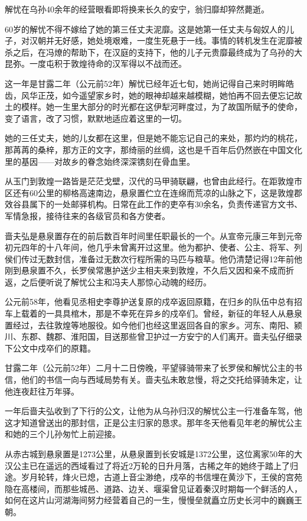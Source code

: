 解忧在乌孙40余年的经营眼看即将换来长久的安宁，翁归靡却猝然薨逝。

60岁的解忧不得不嫁给了她的第三任丈夫泥靡。这是她第一任丈夫与匈奴人的儿子，对汉朝并无好感，她处境艰难，一度生死悬于一线。事情的转机发生在泥靡被杀之后，在冯燎的帮助下，在汉庭的支持下，他的儿子元贵靡最终成为了乌孙的大昆弥。一度屯积于敦煌待命的汉军得以不战而还。

这一年是甘露二年（公元前52年）解忧已经年近七旬，她尚记得自己来时明眸皓齿，风华正茂，如今遥望家乡时，她的眼神却越来越模糊，她怕再不回去便忘记故土的模样。她一生里大部分的时光都在这伊犁河畔度过，为了故国所赋予的使命，变了语言，改了习惯，默默地适应着这里的一切。

她的三任丈夫，她的儿女都在这里，但是她不能忘记自己的来处，那灼灼的桃花，那苒苒的桑梓，那方正的文字，那绮丽的丝绸，这也是千百年后仍然嵌在中国文化里的基因——对故乡的眷念始终深深镌刻在骨血里。

从玉门到敦煌一路皆是茫茫戈壁，汉代的马甲骑联翩，也曾由此经行。在距敦煌市区还有60公里的柳格高速南边，悬泉置伫立在连绵而荒凉的山脉之下，这是敦煌郡效谷县属下的一处邮驿机构。日常在此工作的吏卒有30余名，负责传递官方文书、军情急报，接待往来的各级官员和各方使者。

啬夫弘是悬泉置存在的前后数百年时间里任职最长的一个。从宣帝元康三年到元帝初元四年的十八年间，他几乎未曾离开过这里。他为都护、使者、公主、将军、列侯们传过无数封信，准备过无数次行程所需的马匹与粮草。他仍清楚记得12年前他刚到悬泉置不久，长罗侯常惠护送少主相夫来到敦煌，不久后又因和亲不成而折返，之后便听说了解忧公主和冯夫人那惊心动魄的经历。

公元前58年，他看见丞相史李尊护送复原的戍卒返回原籍，在归乡的队伍中总有招车上载着的一具具棺木，那是不幸死在异乡的戍卒们。曾经，新征的年轻人从悬泉置经过，去往敦煌等地服役。如今他们也经这里返回各自的家乡。河东、南阳、颍川、东郡、魏郡、淮阳国，目送那些曾卫护过一方安宁的人们离开。啬夫弘仔细录下公文中戍卒们的原籍。

甘露二年（公元前52年）二月十二日傍晚，平望驿骑带来了长罗侯和解忧公主的书信，他们的书信一向与西域局势有关。啬夫弘未敢怠慢，将之交托给驿骑朱定，让他连夜赶往万年驿。

一年后啬夫弘收到了下行的公文，让他为从乌孙归汉的解忧公主一行准备车驾，他这才知道曾送出的那封信，正是公主归家的恳求。那年冬天他看见年老的解忧公主和她的三个儿孙匆忙上前迎接。

从赤古城到悬泉置是1273公里，从悬泉置到长安城是1372公里，这位离家50年的大汉公主已在遥远的西域看过了将近2万轮的日升月落，古稀之年的她终于踏上了归途。岁月轮转，烽火已熄，古道上音尘渺绝，戍卒的书信埋在黄沙下，王侯的宫苑隐在高楼间，而那些城邑、道路、边关、堰渠曾见证着秦汉时期每一个鲜活的人，如何在这片山河湖海间努力经营着自己的一生，慢慢垒就矗立历史长河中的巍巍王朝。

